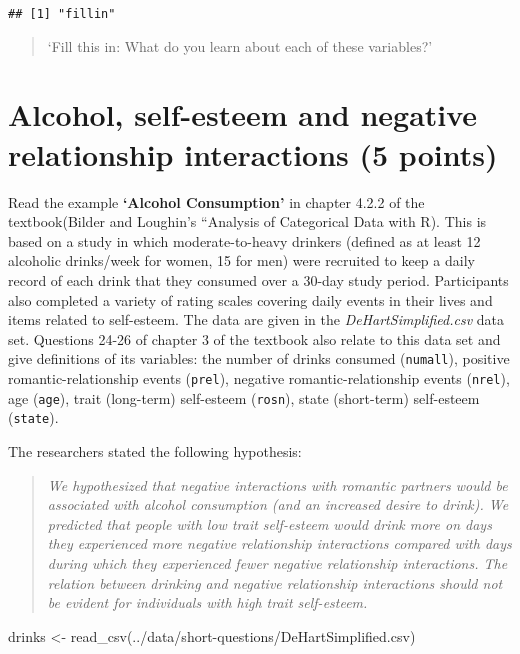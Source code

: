 \documentclass[
  11pt,
]{article}
\newenvironment{Shaded}{\begin{snugshade}}{\end{snugshade}}
\newcommand{\FunctionTok}[1]{\textcolor[rgb]{0.00,0.00,0.00}{#1}}
\newcommand{\NormalTok}[1]{#1}
\newcommand{\OtherTok}[1]{\textcolor[rgb]{0.56,0.35,0.01}{#1}}
\newcommand{\StringTok}[1]{\textcolor[rgb]{0.31,0.60,0.02}{#1}}
\begin{document}
\begin{verbatim}
## [1] "fillin"
\end{verbatim}

\begin{quote}
`Fill this in: What do you learn about each of these variables?'
\end{quote}

\hypertarget{alcohol-self-esteem-and-negative-relationship-interactions-5-points}{%
\section{Alcohol, self-esteem and negative relationship interactions (5
points)}\label{alcohol-self-esteem-and-negative-relationship-interactions-5-points}}

Read the example \textbf{`Alcohol Consumption'} in chapter 4.2.2 of the
textbook(Bilder and Loughin's ``Analysis of Categorical Data with R).
This is based on a study in which moderate-to-heavy drinkers (defined as
at least 12 alcoholic drinks/week for women, 15 for men) were recruited
to keep a daily record of each drink that they consumed over a 30-day
study period. Participants also completed a variety of rating scales
covering daily events in their lives and items related to self-esteem.
The data are given in the \emph{DeHartSimplified.csv }data set.
Questions 24-26 of chapter 3 of the textbook also relate to this data
set and give definitions of its variables: the number of drinks consumed
(\texttt{numall}), positive romantic-relationship events
(\texttt{prel}), negative romantic-relationship events (\texttt{nrel}),
age (\texttt{age}), trait (long-term) self-esteem (\texttt{rosn}), state
(short-term) self-esteem (\texttt{state}).

The researchers stated the following hypothesis:

\begin{quote}
\emph{We hypothesized that negative interactions with romantic partners
would be associated with alcohol consumption (and an increased desire to
drink). We predicted that people with low trait self-esteem would drink
more on days they experienced more negative relationship interactions
compared with days during which they experienced fewer negative
relationship interactions. The relation between drinking and negative
relationship interactions should not be evident for individuals with
high trait self-esteem.}
\end{quote}

\begin{Shaded}
\begin{Highlighting}[]
\NormalTok{drinks }\OtherTok{\textless{}{-}} \FunctionTok{read\_csv}\NormalTok{(}\StringTok{\textquotesingle{}../data/short{-}questions/DeHartSimplified.csv\textquotesingle{}}\NormalTok{)}
\end{Highlighting}
\end{Shaded}
\end{document}
